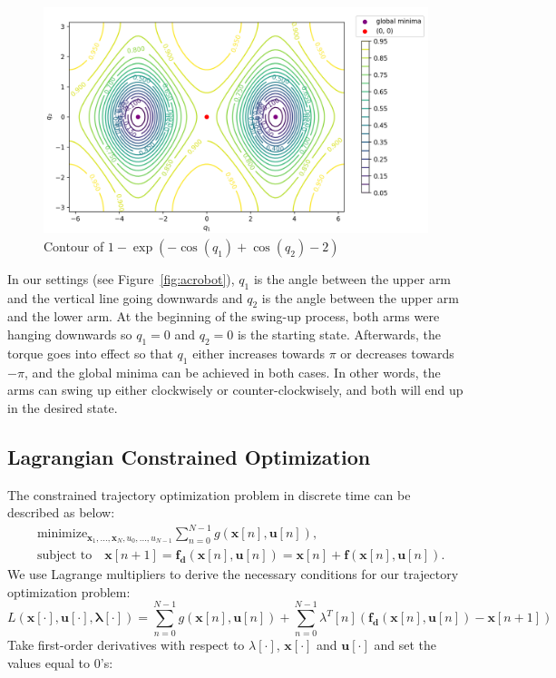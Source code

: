 \begin{figure}[H]
\begin{center}
\includegraphics[width=1.1\linewidth]{cost_contour.png}
\caption[caption]{Contour of $1-\exp(-\cos(q_1) + \cos(q_2)-2)$}
\label{fig:cost_contour}
\end{center}
\end{figure}
 In our settings (see Figure~\ref{fig:acrobot}), $q_1$ is the angle between the upper arm and the vertical line going downwards and $q_2$ is the angle between the upper arm and the lower arm. At the beginning of the swing-up process, both arms were hanging downwards so $q_1 = 0$ and $q_2 = 0$ is the starting state. Afterwards, the torque goes into effect so that $q_1$ either increases towards $\pi$ or decreases towards $-\pi$, and the global minima can be achieved in both cases. In other words, the arms can swing up either clockwisely or counter-clockwisely, and both will end up in the desired state. 
\subsection{Lagrangian Constrained Optimization} \label{Lag}
 \quad The constrained trajectory optimization problem in discrete time can be described as below:
\begin{align} & \text{minimize}_{\mathbf x_1,...,\mathbf x_N, u_0,...,u_{N-1}} \sum_{n=0}^{N-1} g(\mathbf x[n], \mathbf u[n]), \nonumber\\
  & \text{subject to} \quad \mathbf x[n+1] = \mathbf {f_d}(\mathbf x[n], \mathbf u[n]) = \mathbf x[n] + \mathbf f(\mathbf x[n], \mathbf u[n]). 
\end{align}
We use Lagrange multipliers to derive the necessary conditions for
our trajectory optimization problem:
\begin{equation}
L(\mathbf x[\cdot],\mathbf u[\cdot],\mathbf \lambda[\cdot]) = \sum_{n=0}^{N-1} g(\mathbf x[n], \mathbf u[n]) +
  \sum_{n=0}^{N-1} \lambda^T[n] \left(\mathbf{f_d}(\mathbf x[n],\mathbf u[n]) - \mathbf x[n+1]\right)
\end{equation}
Take first-order derivatives with respect to $\lambda[\cdot]$, $\mathbf x[\cdot]$ and $\mathbf u[\cdot]$ and set the values equal to $0$'s:

